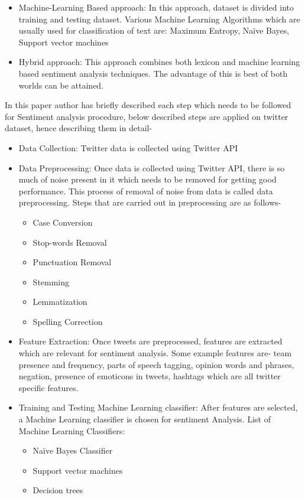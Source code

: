 \documentclass[conference]{IEEEtran}
\begin{document}
{\begin{itemize}
\begin{itemize}
	\end{itemize}
	\item Machine-Learning Based approach: In this approach, dataset is divided into training and testing dataset. Various Machine Learning Algorithms which are usually used for classification of text are: Maximum Entropy, Naïve Bayes, Support vector machines
	\item Hybrid approach: This approach combines both lexicon and machine learning based sentiment analysis techniques. The advantage of this is best of both worlds can be attained.
\end{itemize}
In this paper\cite{b9} author has briefly described each step which needs to be followed for Sentiment analysis procedure, below described steps are applied on twitter dataset, hence describing them in detail- 
\begin{itemize}
	\item Data Collection: Twitter data is collected using Twitter API
	\item Data Preprocessing: Once data is collected using Twitter API, there is so much of noise present in it which needs to be removed for getting good performance. This process of removal of noise from data is called data preprocessing.
	Steps that are carried out in preprocessing are as follows-
	\begin{itemize}
		\item Case Conversion 
		\item Stop-words Removal
		\item Punctuation Removal
		\item Stemming
		\item Lemmatization
		\item Spelling Correction
	\end{itemize}
	\item Feature Extraction: Once tweets are preprocessed, features are extracted which are relevant for sentiment analysis. Some example features are- team presence and frequency, parts of speech tagging, opinion words and phrases, negation, presence of emoticons in tweets, hashtags which are all twitter specific features.
	\item Training and Testing Machine Learning classifier: After features are selected, a Machine Learning classifier is chosen for sentiment Analysis. List of Machine Learning Classifiers:
	\begin{itemize}
		\item Naïve Bayes Classifier
		\item Support vector machines
		\item Decision trees
	\end{itemize}
	

\end{itemize}}
\end{document}

